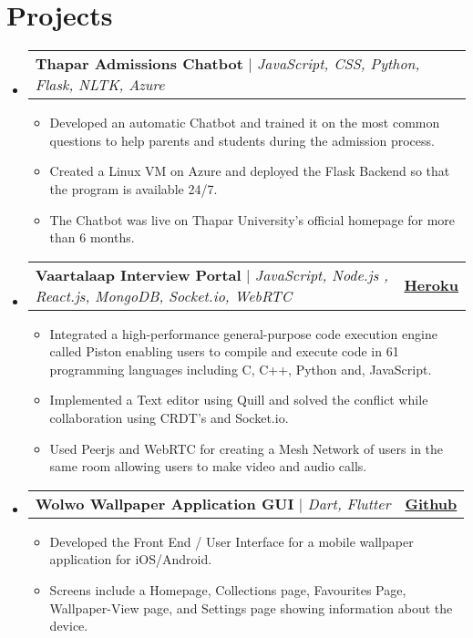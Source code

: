 \documentclass[letterpaper,11pt]{article}
\makeatletter
\newcommand{\resumeItem}[1]{
  \item\small{
    {#1 \vspace{-2pt}}
  }
}
\newcommand{\resumeProjectHeading}[2]{
    \item
    \begin{tabular*}{1.001\textwidth}{l@{\extracolsep{\fill}}r}
      \small#1 & \textbf{\small #2}\\
    \end{tabular*}\vspace{-7pt}
}
\newcommand{\resumeSubHeadingListStart}{\begin{itemize}[leftmargin=0.0in, label={}]}
\newcommand{\resumeSubHeadingListEnd}{\end{itemize}}
\newcommand{\resumeItemListStart}{\begin{itemize}}
\newcommand{\resumeItemListEnd}{\end{itemize}\vspace{-5pt}}
\makeatother
\begin{document}
\section{Projects}
    \vspace{-5pt}
    \resumeSubHeadingListStart
      \resumeProjectHeading
          {\textbf{Thapar Admissions Chatbot} $|$ \emph{ JavaScript, CSS, Python, Flask, NLTK, Azure }}{\href{}{}}
          \resumeItemListStart
            \resumeItem{Developed an automatic Chatbot and trained it on the most common questions to help parents and students during the admission process.}
            \resumeItem{Created a Linux VM on Azure and deployed the Flask Backend so that the program is available 24/7.}
            \resumeItem{The Chatbot was live on Thapar University's official homepage for more than 6 months.}
          \resumeItemListEnd
          \vspace{-13pt}
      \resumeProjectHeading
          {\textbf{Vaartalaap Interview Portal} $|$ \emph{JavaScript, Node.js , React.js, MongoDB, Socket.io, WebRTC}}{\href{https://}{Heroku}}
          \resumeItemListStart
            \resumeItem{Integrated a high-performance general-purpose code execution engine called Piston enabling users to compile and execute code in 61 programming languages including C, C++, Python and, JavaScript. }
            \resumeItem{Implemented a Text editor using Quill and solved the conflict while collaboration using CRDT's and Socket.io.}
            \resumeItem{Used Peerjs and WebRTC for creating a Mesh Network of users in the same room allowing users to make video and audio calls. }
          \resumeItemListEnd 
          \vspace{-13pt}
          \resumeProjectHeading
          {\textbf{Wolwo Wallpaper Application GUI} $|$ \emph{ Dart, Flutter }}{\href{https://}{Github}}
          \resumeItemListStart
          \resumeItem{Developed the Front End / User Interface for a mobile wallpaper application for iOS/Android.}
            \resumeItem{Screens include a Homepage, Collections page, Favourites Page, Wallpaper-View page, and Settings page showing information about the device.}
          \resumeItemListEnd 
    \resumeSubHeadingListEnd
\vspace{-15pt}
 
\end{document}
